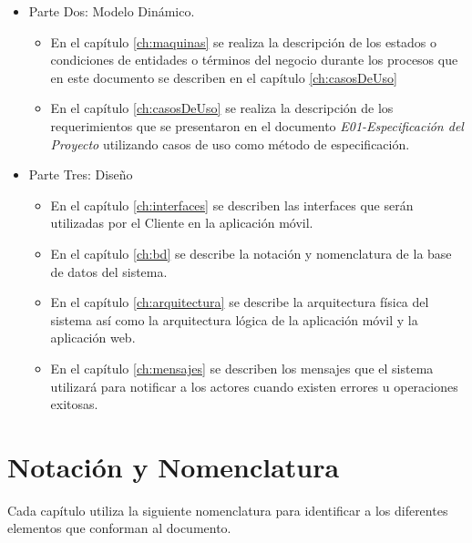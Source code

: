 \begin{itemize}
\begin{itemize}
		\end{itemize}
	\item Parte Dos: \hspace{1pt}
	Modelo Dinámico.
		\begin{itemize}
			\item En el capítulo \ref{ch:maquinas} se realiza la descripción de los estados o condiciones de   entidades o términos del negocio durante los procesos que en este documento se describen en el capítulo \ref{ch:casosDeUso}
			\item En el capítulo \ref{ch:casosDeUso} se realiza la descripción de los requerimientos que se presentaron en el documento \textit{E01-Especificación del Proyecto} utilizando casos de uso como método de especificación.
		\end{itemize}
	\item Parte Tres: Diseño
		\begin{itemize}
			\item En el capítulo \ref{ch:interfaces} se describen las interfaces que serán utilizadas por el Cliente en la aplicación móvil.
			\item En el capítulo \ref{ch:bd} se describe la notación y nomenclatura de la base de datos del sistema.
			\item En el capítulo \ref{ch:arquitectura} se describe la arquitectura física del sistema así como la arquitectura lógica de la aplicación móvil y la aplicación web.
			\item En el capítulo \ref{ch:mensajes} se describen los mensajes que el sistema utilizará para notificar a los actores cuando existen errores u operaciones exitosas.
		\end{itemize}	
\end{itemize}

\section{Notación y Nomenclatura}

Cada capítulo utiliza la siguiente nomenclatura para identificar a los diferentes elementos que conforman al documento.


